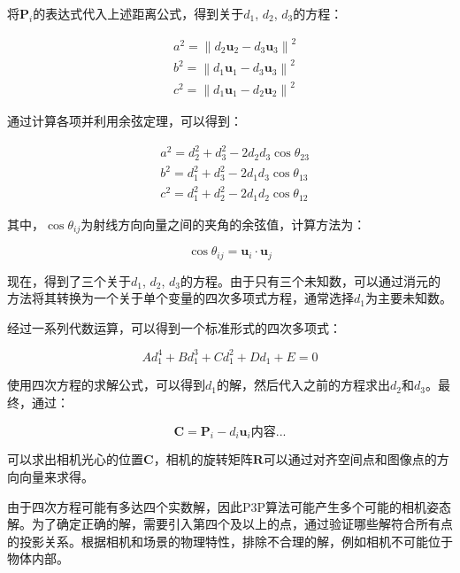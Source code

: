 将$\mathbf{P}_i$的表达式代入上述距离公式，得到关于$d_1$, $d_2$, $d_3$的方程：

\begin{equation}
	\begin{aligned}
		& a^2 = \left\| d_2 \mathbf{u}_2 - d_3 \mathbf{u}_3 \right\|^2 \\
		& b^2 = \left\| d_1 \mathbf{u}_1 - d_3 \mathbf{u}_3 \right\|^2 \\
		& c^2 = \left\| d_1 \mathbf{u}_1 - d_2 \mathbf{u}_2 \right\|^2
	\end{aligned}
\end{equation}


通过计算各项并利用余弦定理，可以得到：

\begin{equation}
	\begin{aligned}
		& a^2 = d_2^2 + d_3^2 - 2 d_2 d_3 \cos \theta_{23} \\
		& b^2 = d_1^2 + d_3^2 - 2 d_1 d_3 \cos \theta_{13} \\
		& c^2 = d_1^2 + d_2^2 - 2 d_1 d_2 \cos \theta_{12}
	\end{aligned}
\end{equation}


其中，$\cos \theta_{ij}$为射线方向向量之间的夹角的余弦值，计算方法为：

\begin{equation}
	\cos \theta_{ij} = \mathbf{u}_i \cdot \mathbf{u}_j
\end{equation}


现在，得到了三个关于$d_1$, $d_2$, $d_3$的方程。由于只有三个未知数，可以通过消元的方法将其转换为一个关于单个变量的四次多项式方程，通常选择$d_1$为主要未知数。


经过一系列代数运算，可以得到一个标准形式的四次多项式：

\begin{equation}
	A d_1^4 + B d_1^3 + C d_1^2 + D d_1 + E = 0
\end{equation}


使用四次方程的求解公式，可以得到$d_1$的解，然后代入之前的方程求出$d_2$和$d_3$。最终，通过：

\begin{equation}
	\mathbf{C} = \mathbf{P}_i - d_i \mathbf{u}_i内容...
\end{equation}


可以求出相机光心的位置$\mathbf{C}$，相机的旋转矩阵$\mathbf{R}$可以通过对齐空间点和图像点的方向向量来求得。


由于四次方程可能有多达四个实数解，因此P3P算法可能产生多个可能的相机姿态解。为了确定正确的解，需要引入第四个及以上的点，通过验证哪些解符合所有点的投影关系。根据相机和场景的物理特性，排除不合理的解，例如相机不可能位于物体内部。


